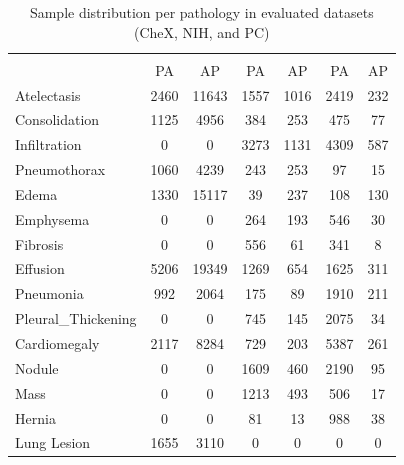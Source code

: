 \documentclass[review,1p,times,numbers]{elsarticle}
\begin{document}
\begin{table}[htbp]
    \centering
    \caption[Sample Distribution Per Pathology in Evaluated Datasets (CheX, NIH, and PC)]{Sample distribution per pathology in evaluated datasets (CheX, NIH, and PC)}%
    \label{tab:taxonomy.table.2.datasets.ninstances}
    \begin{tabular}{lcccccc}
        \rowcolor[HTML]{79A8A4}
        \multicolumn{1}{c}{\cellcolor{table_title}{}} &
        \multicolumn{2}{c}{\cellcolor{table_title}{\textbf{CheXpert}}} &
        \multicolumn{2}{c}{\cellcolor{table_title}{\textbf{NIH}}} &
        \multicolumn{2}{c}{\cellcolor{table_title}{\textbf{PADCHEST}}} \\
        \rowcolor[HTML]{79A8A4}
        \multicolumn{1}{c}{\multirow{-2}{*}{\cellcolor{table_title}{\textbf{Pathologies\textbackslash{}Dataset}}}} & {PA} & {AP} & {PA} & {AP} & {PA} & {AP} \\
        Atelectasis        & 2460 & 11643 & 1557 & 1016 & 2419 & 232 \\
        Consolidation      & 1125 & 4956  & 384  & 253  & 475  & 77  \\
        Infiltration       & 0    & 0     & 3273 & 1131 & 4309 & 587 \\
        Pneumothorax       & 1060 & 4239  & 243  & 253  & 97   & 15  \\
        Edema              & 1330 & 15117 & 39   & 237  & 108  & 130 \\
        Emphysema          & 0    & 0     & 264  & 193  & 546  & 30  \\
        Fibrosis           & 0    & 0     & 556  & 61   & 341  & 8   \\
        Effusion           & 5206 & 19349 & 1269 & 654  & 1625 & 311 \\
        Pneumonia          & 992  & 2064  & 175  & 89   & 1910 & 211 \\
        Pleural\_Thickening& 0    & 0     & 745  & 145  & 2075 & 34  \\
        Cardiomegaly       & 2117 & 8284  & 729  & 203  & 5387 & 261 \\
        Nodule             & 0    & 0     & 1609 & 460  & 2190 & 95  \\
        Mass               & 0    & 0     & 1213 & 493  & 506  & 17  \\
        Hernia             & 0    & 0     & 81   & 13   & 988  & 38  \\
        Lung Lesion        & 1655 & 3110  & 0    & 0    & 0    & 0   \\

\end{tabular}
\end{table}
\end{document}
